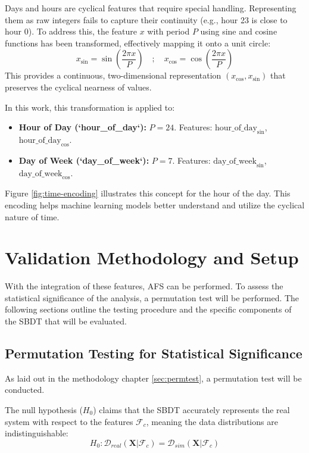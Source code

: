 Days and hours are cyclical features that require special handling. Representing them as raw integers fails to capture their continuity (e.g., hour 23 is close to hour 0). To address this, the feature $x$ with period $P$ using sine and cosine functions has been transformed, effectively mapping it onto a unit circle:
\begin{equation}
    x_{\sin} = \sin\left(\frac{2 \pi x}{P}\right) \quad ; \quad
    x_{\cos} = \cos\left(\frac{2 \pi x}{P}\right)
    \label{eq:sincos_transform}
\end{equation}
This provides a continuous, two-dimensional representation $(x_{\cos}, x_{\sin})$ that preserves the cyclical nearness of values.

In this work, this transformation is applied to:

\begin{itemize}
    \item \textbf{Hour of Day (`hour\_of\_day`):} $P=24$. Features: $\text{hour\_of\_day}_{\sin}$, $\text{hour\_of\_day}_{\cos}$.
    \item \textbf{Day of Week (`day\_of\_week`):} $P=7$. Features: $\text{day\_of\_week}_{\sin}$, $\text{day\_of\_week}_{\cos}$.
\end{itemize}

Figure \ref{fig:time-encoding} illustrates this concept for the hour of the day. This encoding helps machine learning models better understand and utilize the cyclical nature of time.

\section{Validation Methodology and Setup}
With the integration of these features, AFS can be performed. To assess the statistical significance of the analysis, a permutation test will be performed. The following sections outline the testing procedure and the specific components of the SBDT that will be evaluated.

\subsection*{Permutation Testing for Statistical Significance}
\label{sec:model-logic}

As laid out in the methodology chapter \autoref{sec:permtest}, a permutation test will be conducted.

\noindent The null hypothesis ($H_0$) claims that the SBDT accurately represents the real system with respect to the features $\mathcal{F}_c$, meaning the data distributions are indistinguishable:
\begin{equation}
    H_0: \mathcal{D}_{real}(\mathbf{X} | \mathcal{F}_c) = \mathcal{D}_{sim}(\mathbf{X} | \mathcal{F}_c)
    \label{eq:h0}
\end{equation}

